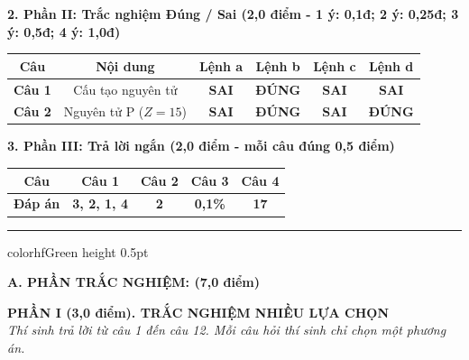 \documentclass[11pt,a4paper]{article}
\begin{document}
\vspace{2pt}
\noindent
\textbf{\color{mainGreen}2. Phần II: Trắc nghiệm Đúng / Sai (2,0 điểm - 1 ý: 0,1đ; 2 ý: 0,25đ; 3 ý: 0,5đ; 4 ý: 1,0đ)}
\begin{center}
\renewcommand{\arraystretch}{1.2}
\begin{tabular}{|c|c|c|c|c|c|}
\hline
\rowcolor{tableGreen}
\textbf{Câu} & \textbf{Nội dung} & \textbf{Lệnh a} & \textbf{Lệnh b} & \textbf{Lệnh c} & \textbf{Lệnh d} \\
\hline
\textbf{Câu 1} & Cấu tạo nguyên tử & \textbf{\color{solBlue}SAI} & \textbf{\color{hfRed}ĐÚNG} & \textbf{\color{solBlue}SAI} & \textbf{\color{solBlue}SAI} \\
\hline
\textbf{Câu 2} & Nguyên tử P ($Z=15$) & \textbf{\color{solBlue}SAI} & \textbf{\color{hfRed}ĐÚNG} & \textbf{\color{solBlue}SAI} & \textbf{\color{hfRed}ĐÚNG} \\
\hline
\end{tabular}
\end{center}

\vspace{2pt}
\noindent
\textbf{\color{mainGreen}3. Phần III: Trả lời ngắn (2,0 điểm - mỗi câu đúng 0,5 điểm)}
\begin{center}
\renewcommand{\arraystretch}{1.2}
\begin{tabular}{|c|c|c|c|c|}
\hline
\rowcolor{tableGreen}
\textbf{Câu} & \textbf{Câu 1} & \textbf{Câu 2} & \textbf{Câu 3} & \textbf{Câu 4} \\
\hline
\textbf{Đáp án} & \textbf{\color{hfRed}3, 2, 1, 4} & \textbf{\color{hfRed}2} & \textbf{\color{hfRed}0,1\%} & \textbf{\color{hfRed}17} \\
\hline
\end{tabular}
\end{center}

\vspace{4pt}
\hrule color{hfGreen} height 0.5pt

\vspace{4pt}
\noindent
{\color{mainGreen}\textbf{\Large A. PHẦN TRẮC NGHIỆM: (7,0 điểm)}}

\vspace{3pt}
\noindent
{\color{mainGreen}\textbf{\large PHẦN I (3,0 điểm). TRẮC NGHIỆM NHIỀU LỰA CHỌN}}\\
\textit{\small Thí sinh trả lời từ câu 1 đến câu 12. Mỗi câu hỏi thí sinh chỉ chọn một phương án.}
\vspace{2pt}
\end{document}

